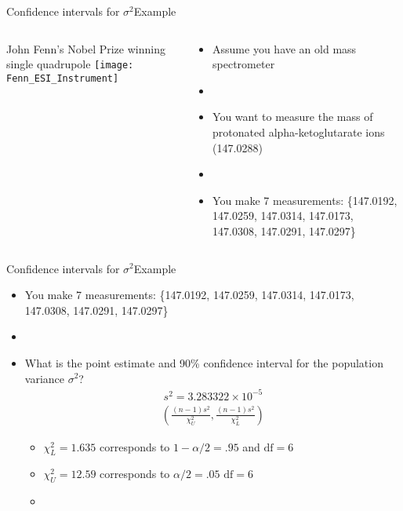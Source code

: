 \documentclass[xcolor=dvipsnames]{beamer}
\begin{document}
\begin{frame}{Confidence intervals for $\sigma^2$}{Example}
	\begin{columns}
		\begin{column}{.5 \textwidth}
			 John Fenn's Nobel Prize winning single quadrupole
			\texttt{[image: Fenn\_ESI\_Instrument]}
		\end{column}
		\begin{column}{.5\textwidth}
			\begin{itemize}
				\item Assume you have an old mass spectrometer
				\item[]
				\item You want to measure the mass of protonated alpha-ketoglutarate ions (147.0288)
				\item[]
				\item You make 7 measurements: \{147.0192, 147.0259, 147.0314, 147.0173, 147.0308, 147.0291, 147.0297\}
			\end{itemize}
		\end{column}
	\end{columns}
\end{frame}

\begin{frame}{Confidence intervals for $\sigma^2$}{Example}
	\begin{itemize}
		\item You make 7 measurements: \{147.0192, 147.0259, 147.0314, 147.0173, 147.0308, 147.0291, 147.0297\}
		\item[]
		\item What is the point estimate and 90\% confidence interval for the population variance $\sigma^2$?
		\begin{gather*}
			s^2 = 3.283322 \times 10^{-5}
		\end{gather*}
		\begin{gather*}
			\left(\frac{(n-1) s^2}{\chi_U^2}, \frac{(n-1)s^2}{\chi_L^2} \right)
		\end{gather*}
		
		\begin{itemize}
			\item $\chi^2_L = 1.635$ corresponds to $1 - \alpha / 2 =.95$ and $\text{df} = 6$
			\item $\chi^2_U = 12.59$ corresponds to $\alpha / 2 = .05$ $\text{df} = 6$
			\item[]
		\end{itemize}
	\end{itemize}
\end{frame}
\end{document}
